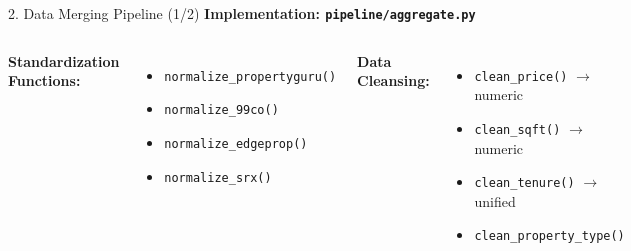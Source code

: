 \documentclass[aspectratio=169,10pt]{beamer}
\begin{document}
\begin{frame}{2. Data Merging Pipeline (1/2)}
    \textbf{Implementation: \texttt{pipeline/aggregate.py}}
    
    \vspace{0.4cm}
    
    \begin{columns}[T]
        \textbf{Standardization Functions:}
        \begin{itemize}
            \item \texttt{normalize\_propertyguru()}
            \item \texttt{normalize\_99co()}
            \item \texttt{normalize\_edgeprop()}
            \item \texttt{normalize\_srx()}
        \end{itemize}
        
        \textbf{Data Cleansing:}
        \begin{itemize}
            \item \texttt{clean\_price()} $\rightarrow$ numeric
            \item \texttt{clean\_sqft()} $\rightarrow$ numeric
            \item \texttt{clean\_tenure()} $\rightarrow$ unified
            \item \texttt{clean\_property\_type()}
        \end{itemize}
    \end{columns}
\end{frame}
\end{document}

